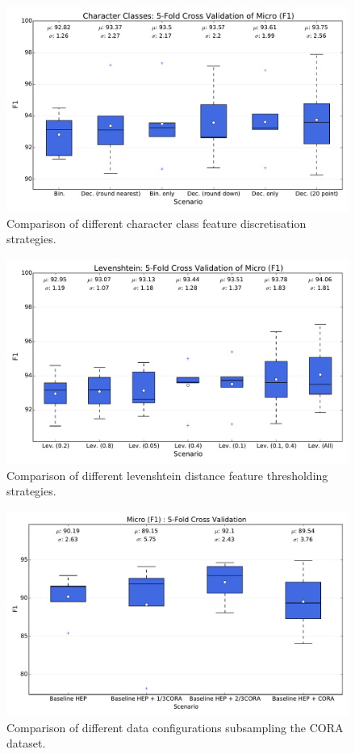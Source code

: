 \begin{figure}[h]
\center
\includegraphics[width=5.5in]{Figures/micro_classes.pdf}
\caption{Comparison of different character class feature discretisation strategies.}
\label{fig:classes_micro}
\end{figure}

\begin{figure}[h]
\center
\includegraphics[width=5.5in]{Figures/micro_levenshtein.pdf}
\caption{Comparison of different levenshtein distance feature thresholding strategies.}
\label{fig:levenshtein_micro}
\end{figure}

\begin{figure}[h]
\center
\includegraphics[width=5.5in]{Figures/micro_subsampling.pdf}
\caption{Comparison of different data configurations subsampling the CORA dataset.}
\label{fig:subsampling_micro}
\end{figure}

